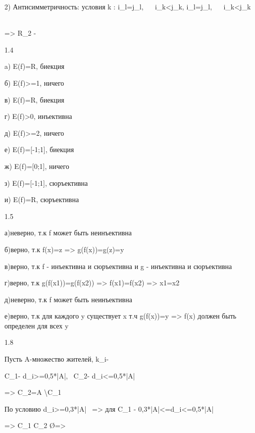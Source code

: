 \documentclass[12pt]{article}
\begin{document}
    2) Антисимметричность: условия \exists k : i_l=j_l, \  \ i_k<j_k, i_l=j_l, \  \ i_k<j_k \ 

    => R_2 - \  \ 

\item 1.4

a) E(f)=R, биекция

б) E(f)>=1, ничего

в) E(f)=R, биекция

г) E(f)>0, инъективна

д) E(f)>=2, ничего

е) E(f)=[-1;1], биекция

ж) E(f)=[0;1], ничего

з) E(f)=[-1;1], сюръективна

и) E(f)=R, сюръективна

\item 1.5

а)неверно, т.к f может быть неинъективна

б)верно, т.к f(x)=z => g(f(x))=g(z)=y

в)верно, т.к f - инъективна и сюръективна и g - инъективна и сюръективна

г)верно, т.к g(f(x1))=g(f(x2)) => f(x1)=f(x2) => x1=x2

д)неверно, т.к f может быть неинъективна

е)верно, т.к для каждого y существует x т.ч g(f(x))=y => f(x) должен быть определен для всех y

\item 1.8

Пусть A-множество жителей, k_i-


C_1- d_i>=0,5*|A|, \ C_2- d_i<=0,5*|A|

=> C_2=A \backslash C_1

По условию d_i>=0,3*|A| \ => для C_1 - 0,3*|A|<=d_i<=0,5*|A|    

=> C_1 \cap C_2 \neq\O => 
\end{document}
